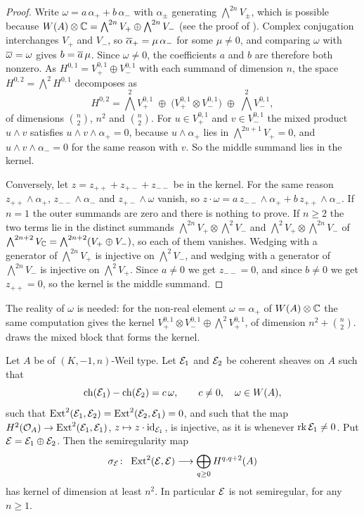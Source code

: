 \begin{proof}
Write $\omega=a\,\alpha_{+}+b\,\alpha_{-}$ with $\alpha_{\pm}$ generating
$\bigwedge^{2n}V_{\pm}$, which is possible because
$W(A)\otimes\mathbb{C}=\bigwedge^{2n}V_{+}\oplus\bigwedge^{2n}V_{-}$ (see the proof
of ). Complex conjugation interchanges $V_{+}$ and
$V_{-}$, so $\overline{\alpha}_{+}=\mu\,\alpha_{-}$ for some $\mu\ne0$, and
comparing $\omega$ with $\overline{\omega}=\omega$ gives $b=\overline{a}\,\mu$. Since
$\omega\ne0$, the coefficients $a$ and $b$ are therefore both nonzero. As
$H^{0,1}=V_{+}^{0,1}\oplus V_{-}^{0,1}$ with each summand of dimension $n$,
the space $H^{0,2}=\bigwedge^{2}H^{0,1}$ decomposes as
\[
  H^{0,2}
  =\textstyle\bigwedge^{2}V_{+}^{0,1}
  \;\oplus\;\bigl(V_{+}^{0,1}\otimes V_{-}^{0,1}\bigr)
  \;\oplus\;\bigwedge^{2}V_{-}^{0,1},
\]
of dimensions $\binom{n}{2}$, $n^{2}$ and $\binom{n}{2}$.
For $u\in V_{+}^{0,1}$ and $v\in V_{-}^{0,1}$ the mixed product $u\wedge v$
satisfies $u\wedge v\wedge\alpha_{+}=0$, because $u\wedge\alpha_{+}$ lies in
$\bigwedge^{2n+1}V_{+}=0$, and $u\wedge v\wedge\alpha_{-}=0$ for the same
reason with $v$. So the middle summand lies in the kernel.

Conversely, let $z=z_{++}+z_{+-}+z_{--}$ be in the kernel. For the same
reason $z_{++}\wedge\alpha_{+}$, $z_{--}\wedge\alpha_{-}$ and
$z_{+-}\wedge\omega$ vanish, so
$z\cdot\omega=a\,z_{--}\wedge\alpha_{+}+b\,z_{++}\wedge\alpha_{-}$. If $n=1$
the outer summands are zero and there is nothing to prove. If $n\ge2$ the two
terms lie in the distinct summands
$\bigwedge^{2n}V_{+}\otimes\bigwedge^{2}V_{-}$ and
$\bigwedge^{2}V_{+}\otimes\bigwedge^{2n}V_{-}$ of
$\bigwedge^{2n+2}V_{\mathbb{C}}=\bigwedge^{2n+2}(V_{+}\oplus V_{-})$, so each of them
vanishes. Wedging with a generator of $\bigwedge^{2n}V_{+}$ is injective on
$\bigwedge^{2}V_{-}$, and wedging with a generator of $\bigwedge^{2n}V_{-}$ is
injective on $\bigwedge^{2}V_{+}$. Since $a\neq0$ we get $z_{--}=0$, and since
$b\neq0$ we get $z_{++}=0$, so the kernel is the middle summand.
\end{proof}

The reality of $\omega$ is needed: for the non-real element
$\omega=\alpha_{+}$ of $W(A)\otimes\mathbb{C}$ the same computation gives the
kernel $V_{+}^{0,1}\otimes V_{-}^{0,1}\oplus\bigwedge^{2}V_{+}^{0,1}$, of
dimension $n^{2}+\binom{n}{2}$.  draws the mixed block that forms the kernel.

\begin{theorem}
\label{thm:rankzero}
Let $A$ be of $(K,-1,n)$-Weil type. Let $\mathcal{E}_{1}$ and $\mathcal{E}_{2}$ be coherent
sheaves on $A$ such that
\[
  \operatorname{ch}(\mathcal{E}_{1})-\operatorname{ch}(\mathcal{E}_{2})=c\,\omega,\qquad c\neq0,\quad \omega\in W(A),
\]
such that $\operatorname{Ext}^{2}(\mathcal{E}_{1},\mathcal{E}_{2})=\operatorname{Ext}^{2}(\mathcal{E}_{2},\mathcal{E}_{1})=0$, and such
that the map $H^{2}(\mathcal{O}_{A})\to\operatorname{Ext}^{2}(\mathcal{E}_{1},\mathcal{E}_{1})$,
$z\mapsto z\cdot\operatorname{id}_{\mathcal{E}_{1}}$, is injective, as it is whenever
$\operatorname{rk}\mathcal{E}_{1}\neq0$. Put $\mathcal{E}=\mathcal{E}_{1}\oplus\mathcal{E}_{2}$. Then the semiregularity
map
\[
  \sigma_{\cE}\colon\ \Ext^{2}(\cE,\cE)\longrightarrow\bigoplus_{q\ge0}H^{q,q+2}(A)
\]
has kernel of dimension at least $n^{2}$. In particular $\mathcal{E}$ is not
semiregular, for any $n\ge1$.
\end{theorem}

